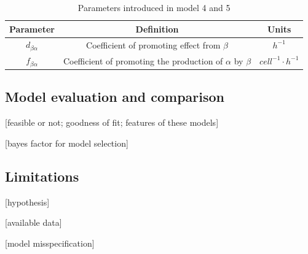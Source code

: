 \documentclass[12pt,a4paper]{report}
\begin{document}
\begin{table}[h!]
    \centering
    \begin{tabular}{|c c c|} 
     \hline
     Parameter & Definition & Units\\ [0.5ex] 
     \hline\hline
     $d_{\beta\alpha}$ & Coefficient of promoting effect from $\beta$ & $h^{-1}$  \\ 
     \hline
     $f_{\beta\alpha}$ & Coefficient of promoting the production of $\alpha$ by $\beta$ & $cell^{-1}\cdotp h^{-1}$  \\ 
    [1ex] 
     \hline
    \end{tabular}
    \caption{Parameters introduced in model 4 and 5}
    \label{table:m45}
\end{table}



\subsection{Model evaluation and comparison}

[feasible or not; goodness of fit; features of these models]

[bayes factor for model selection]

\subsection{Limitations}

[hypothesis]

[available data]

[model misspecification]








\end{document}
